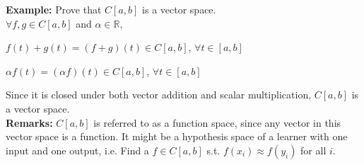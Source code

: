 \documentclass{article}
\begin{document}
\textbf{Example:} Prove that $C[a,b]$ is a vector space. \\
    $\forall f, g \in C[a,b]$ and $\alpha \in \mathbb{R}$,
    \begin{center}
        \item $ f(t) + g(t) = (f + g)(t) \in C[a,b]$, $\forall t \in [a,b]$ 
        \item $ \alpha f(t) = (\alpha f)(t) \in C[a,b]$, $\forall t \in [a,b]$
        
    \end{center} 
Since it is closed under both vector addition and scalar multiplication, $C[a,b]$ is a vector space. \\

\textbf{Remarks:} $C[a,b]$ is referred to as a function space, since any vector in this vector space is a function. It might be a hypothesis space of a learner with one input and one output, i.e. Find a $f \in C[a,b]$ s.t. $f(x_i) \approx f(y_i)$ for all $i$. \\

\pagebreak
\end{document}
